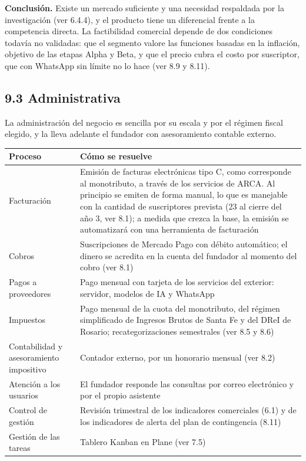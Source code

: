 \textbf{Conclusión.} Existe un mercado suficiente y una necesidad
respaldada por la investigación (ver 6.4.4), y el producto tiene un
diferencial frente a la competencia directa. La factibilidad comercial
depende de dos condiciones todavía no validadas: que el segmento valore
las funciones basadas en la inflación, objetivo de las etapas Alpha y
Beta, y que el precio cubra el costo por suscriptor, que con WhatsApp
sin límite no lo hace (ver 8.9 y 8.11).

\subsection*{9.3 Administrativa}\label{administrativa}

La administración del negocio es sencilla por su escala y por el régimen
fiscal elegido, y la lleva adelante el fundador con asesoramiento
contable externo.

{\def\LTcaptype{none} %
\begin{longtable}[]{@{}
  >{\raggedright\arraybackslash}p{}
  >{\raggedright\arraybackslash}p{}@{}}
\toprule\noalign{}
\begin{minipage}[b]{\linewidth}\raggedright
Proceso
\end{minipage} & \begin{minipage}[b]{\linewidth}\raggedright
Cómo se resuelve
\end{minipage} \\
\midrule\noalign{}
\endhead
\bottomrule\noalign{}
\endlastfoot
Facturación & Emisión de facturas electrónicas tipo C, como corresponde
al monotributo, a través de los servicios de ARCA. Al principio se
emiten de forma manual, lo que es manejable con la cantidad de
suscriptores prevista (23 al cierre del año 3, ver 8.1); a medida que
crezca la base, la emisión se automatizará con una herramienta de
facturación \\
Cobros & Suscripciones de Mercado Pago con débito automático; el dinero
se acredita en la cuenta del fundador al momento del cobro (ver 8.1) \\
Pagos a proveedores & Pago mensual con tarjeta de los servicios del
exterior: servidor, modelos de IA y WhatsApp \\
Impuestos & Pago mensual de la cuota del monotributo, del régimen
simplificado de Ingresos Brutos de Santa Fe y del DReI de Rosario;
recategorizaciones semestrales (ver 8.5 y 8.6) \\
Contabilidad y asesoramiento impositivo & Contador externo, por un
honorario mensual (ver 8.2) \\
Atención a los usuarios & El fundador responde las consultas por correo
electrónico y por el propio asistente \\
Control de gestión & Revisión trimestral de los indicadores comerciales
(6.1) y de los indicadores de alerta del plan de contingencia (8.11) \\
Gestión de las tareas & Tablero Kanban en Plane (ver 7.5) \\
\end{longtable}
}

